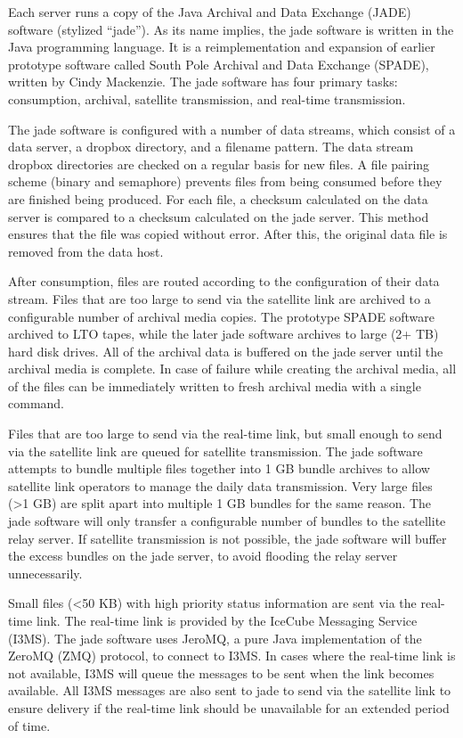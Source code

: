 Each server runs a copy of the Java Archival and Data Exchange (JADE) software (stylized “jade”). As its name implies, the jade software
is written in the Java programming language. It is a reimplementation and expansion of earlier prototype software called South Pole Archival
and Data Exchange (SPADE), written by Cindy Mackenzie. The jade software has four primary tasks: consumption, archival, satellite transmission, and real-time
transmission.

The jade software is configured with a number of data streams, which consist of a data server, a dropbox directory, and a filename pattern.
The data stream dropbox directories are checked on a regular basis for new files. A file pairing scheme (binary and semaphore) prevents files
from being consumed before they are finished being produced. For each file, a checksum calculated on the data server is compared to a checksum
calculated on the jade server. This method ensures that the file was copied without error. After this, the original data file is removed from the data host.

After consumption, files are routed according to the configuration of their data stream. Files that are too large to send via the satellite link are archived to
a configurable number of archival media copies. The prototype SPADE software archived to LTO tapes, while the later jade software archives to large (2+ TB) hard
disk drives. All of the archival data is buffered on the jade server until the archival media is complete. In case of failure while creating the archival media,
all of the files can be immediately written to fresh archival media with a single command.

Files that are too large to send via the real-time link, but small enough to send via the satellite link are queued for satellite transmission. The jade software
attempts to bundle multiple files together into 1 GB bundle archives to allow satellite link operators to manage the daily data transmission. Very large files
(>1 GB) are split apart into multiple 1 GB bundles for the same reason. The jade software will only transfer a configurable number of bundles to the satellite
relay server. If satellite transmission is not possible, the jade software will buffer the excess bundles on the jade server, to avoid flooding the relay server
unnecessarily.


Small files (<50 KB) with high priority status information are sent via the real-time link. The real-time link is provided by the IceCube Messaging Service
(I3MS). The jade software uses JeroMQ, a pure Java implementation of the ZeroMQ (ZMQ) protocol, to connect to I3MS. In cases where the real-time link is not
available, I3MS will queue the messages to be sent when the link becomes available. All I3MS messages are also sent to jade to send via the satellite link to
ensure delivery if the real-time link should be unavailable for an extended period of time.

